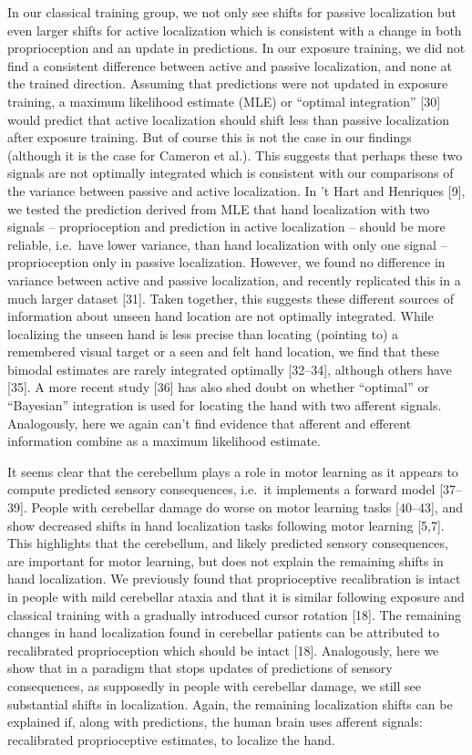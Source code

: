 \documentclass[10pt,letterpaper]{article}
\begin{document}
In our classical training group, we not only see shifts for passive
localization but even larger shifts for active localization which is
consistent with a change in both proprioception and an update in
predictions. In our exposure training, we did not find a consistent
difference between active and passive localization, and none at the
trained direction. Assuming that predictions were not updated in
exposure training, a maximum likelihood estimate (MLE) or ``optimal
integration'' {[}30{]} would predict that active localization should
shift less than passive localization after exposure training. But of
course this is not the case in our findings (although it is the case for
Cameron et al.). This suggests that perhaps these two signals are not
optimally integrated which is consistent with our comparisons of the
variance between passive and active localization. In 't Hart and
Henriques {[}9{]}, we tested the prediction derived from MLE that hand
localization with two signals -- proprioception and prediction in active
localization -- should be more reliable, i.e.~have lower variance, than
hand localization with only one signal -- proprioception only in passive
localization. However, we found no difference in variance between active
and passive localization, and recently replicated this in a much larger
dataset {[}31{]}. Taken together, this suggests these different sources
of information about unseen hand location are not optimally integrated.
While localizing the unseen hand is less precise than locating (pointing
to) a remembered visual target or a seen and felt hand location, we find
that these bimodal estimates are rarely integrated optimally
{[}32--34{]}, although others have {[}35{]}. A more recent study
{[}36{]} has also shed doubt on whether ``optimal'' or ``Bayesian''
integration is used for locating the hand with two afferent signals.
Analogously, here we again can't find evidence that afferent and
efferent information combine as a maximum likelihood estimate.

It seems clear that the cerebellum plays a role in motor learning as it
appears to compute predicted sensory consequences, i.e.~it implements a
forward model {[}37--39{]}. People with cerebellar damage do worse on
motor learning tasks {[}40--43{]}, and show decreased shifts in hand
localization tasks following motor learning {[}5,7{]}. This highlights
that the cerebellum, and likely predicted sensory consequences, are
important for motor learning, but does not explain the remaining shifts
in hand localization. We previously found that proprioceptive
recalibration is intact in people with mild cerebellar ataxia and that
it is similar following exposure and classical training with a gradually
introduced cursor rotation {[}18{]}. The remaining changes in hand
localization found in cerebellar patients can be attributed to
recalibrated proprioception which should be intact {[}18{]}.
Analogously, here we show that in a paradigm that stops updates of
predictions of sensory consequences, as supposedly in people with
cerebellar damage, we still see substantial shifts in localization.
Again, the remaining localization shifts can be explained if, along with
predictions, the human brain uses afferent signals: recalibrated
proprioceptive estimates, to localize the hand.
\end{document}

